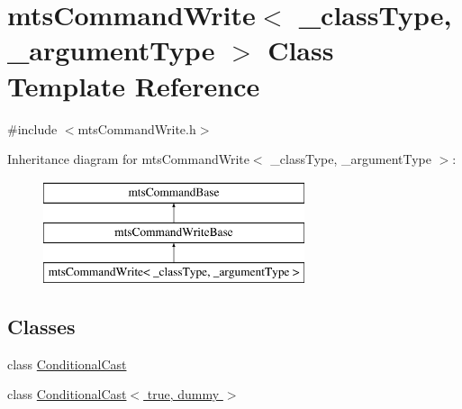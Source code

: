\hypertarget{classmts_command_write}{}\section{mts\+Command\+Write$<$ \+\_\+class\+Type, \+\_\+argument\+Type $>$ Class Template Reference}
\label{classmts_command_write}


{\ttfamily \#include $<$mts\+Command\+Write.\+h$>$}

Inheritance diagram for mts\+Command\+Write$<$ \+\_\+class\+Type, \+\_\+argument\+Type $>$\+:\begin{figure}[H]
\begin{center}
\leavevmode
\includegraphics[height=3.000000cm]{d9/d13/classmts_command_write}
\end{center}
\end{figure}
\subsection*{Classes}
\begin{DoxyCompactItemize}
\item 
class \hyperlink{classmts_command_write_1_1_conditional_cast}{Conditional\+Cast}
\item 
class \hyperlink{classmts_command_write_1_1_conditional_cast_3_01true_00_01dummy_01_4}{Conditional\+Cast$<$ true, dummy $>$}
\end{DoxyCompactItemize}
